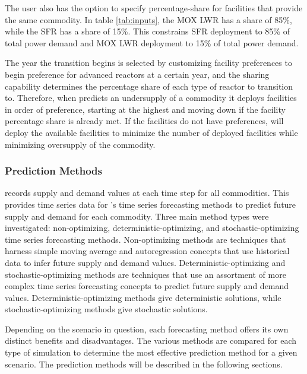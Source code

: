     The user also has the option to specify percentage-share for facilities 
    that provide the same commodity.   
    In table \ref{tab:inputs}, 
    the \gls{MOX} \gls{LWR} has a share of 85\%, while 
    the \gls{SFR} has a share of 15\%. 
    This constrains \gls{SFR} deployment to 85\% of total power demand 
    and \gls{MOX} \gls{LWR} deployment to 15\% of total power demand.  

    The year the transition begins is selected by customizing facility 
    preferences to begin preference for advanced reactors at a certain year,
    and the sharing capability determines the percentage 
    share of each type of reactor to transition to. 
    Therefore, when \deploy predicts an undersupply of a commodity 
    it deploys facilities in order of preference, starting at 
    the highest and moving down if the facility percentage share 
    is already met. 
    If the facilities do not have preferences, \deploy 
    will deploy the available facilities to minimize the number of 
    deployed facilities while minimizing oversupply of the commodity.

\subsubsection{\textbf{Prediction Methods}}
\deploy records supply and demand values at each time step for all 
commodities. 
This provides time series data for \deploy's time series 
forecasting methods to predict future supply and demand for each 
commodity.  
Three main method types were investigated: non-optimizing, 
deterministic-optimizing, and stochastic-optimizing
time series forecasting methods.
Non-optimizing methods are techniques that harness 
simple moving average and autoregression concepts that use 
historical data to infer future supply and demand values. 
Deterministic-optimizing and stochastic-optimizing 
methods are techniques 
that use an assortment of more complex time series forecasting 
concepts to predict future supply and demand values. 
Deterministic-optimizing methods give deterministic solutions,
while stochastic-optimizing methods give stochastic solutions. 

Depending on the scenario in question, each forecasting method 
offers its own distinct benefits and disadvantages.
The various methods are compared for each type of simulation 
to determine the most effective prediction method for 
a given scenario.  
The prediction methods will be described in the following 
sections. 


